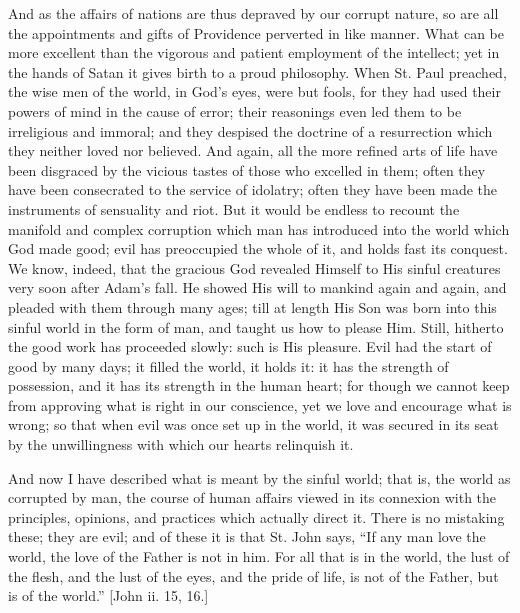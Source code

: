 And as the affairs of nations are thus depraved by our corrupt
nature, so are all the appointments and gifts of Providence perverted
in like manner. What can be more excellent than the vigorous and
patient employment of the intellect; yet in the hands of Satan it
gives birth to a proud philosophy. When St. Paul preached, the wise
men of the world, in God's eyes, were but fools, for they had used
their powers of mind in the cause of error; their reasonings even led
them to be irreligious and immoral; and they despised the doctrine of
a resurrection which they neither loved nor believed. And again, all
the more refined arts of life have been disgraced by the vicious
tastes of those who excelled in them; often they have been consecrated
to the service of idolatry; often they have been made the instruments
of sensuality and riot. But it would be endless to recount the
manifold and complex corruption which man has introduced into the
world which God made good; evil has preoccupied the whole of it, and
holds fast its conquest. We know, indeed, that the gracious God
revealed Himself to His sinful creatures very soon after Adam's fall.
He showed His will to mankind again and again, and pleaded with them
through many ages; till at length His Son was born into this sinful
world in the form of man, and taught us how to please Him. Still,
hitherto the good work has proceeded slowly: such is His pleasure.
Evil had the start of good by many days; it filled the world, it holds
it: it has the strength of possession, and it has its strength in the
human heart; for though we cannot keep from approving what is right in
our conscience, yet we love and encourage what is wrong; so that when
evil was once set up in the world, it was secured in its seat by the
unwillingness with which our hearts relinquish it.

And now I have described what is meant by the sinful world; that
is, the world as corrupted by man, the course of human affairs viewed
in its connexion with the principles, opinions, and practices which
actually direct it. There is no mistaking these; they are evil; and of
these it is that St. John says, ``If any man love the world, the
love of the Father is not in him. For all that is in the world, the
lust of the flesh, and the lust of the eyes, and the pride of life, is
not of the Father, but is of the world.'' [John ii. 15, 16.]

